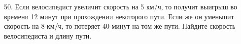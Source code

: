 50. Если велосипедист увеличит скорость на 5 км/ч, то получит выигрыш во времени 12 минут при прохождении некоторого пути. Если же он уменьшит скорость на 8 км/ч, то потеряет 40 минут на том же пути. Найдите скорость велосипедиста и длину пути.\\
